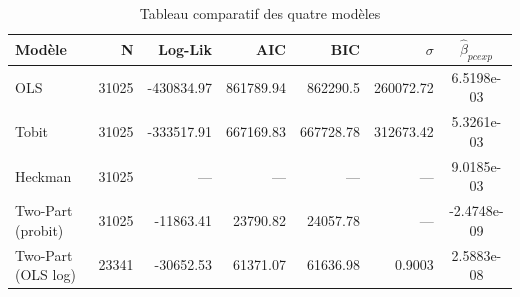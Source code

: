 \begin{table}[htbp]
\centering
\caption{Tableau comparatif des quatre modèles}
\label{tab:comparatif}
\begin{tabular}{lrrrrrc}
\hline
Modèle & N & Log-Lik & AIC & BIC & $\sigma$ & $\hat{\beta}_{pcexp}$ \\
\hline
OLS & 31025 & -430834.97 & 861789.94 & 862290.5 & 260072.72 & 6.5198e-03 \\
Tobit & 31025 & -333517.91 & 667169.83 & 667728.78 & 312673.42 & 5.3261e-03 \\
Heckman & 31025 & — & — & — & — & 9.0185e-03 \\
Two-Part (probit) & 31025 & -11863.41 & 23790.82 & 24057.78 & — & -2.4748e-09 \\
Two-Part (OLS log) & 23341 & -30652.53 & 61371.07 & 61636.98 & 0.9003 & 2.5883e-08 \\
\hline
\end{tabular}
\end{table}
